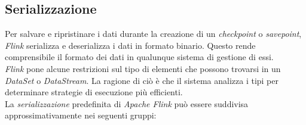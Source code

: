 \subsection{Serializzazione}
Per salvare e ripristinare i dati durante la creazione di un \textit{checkpoint} o \textit{savepoint}, \textit{Flink} serializza e deserializza i dati in formato binario. Questo rende comprensibile il formato dei dati in qualunque sistema di gestione di essi.\\
\textit{Flink} pone alcune restrizioni sul tipo di elementi che possono trovarsi in un \textit{DataSet} o \textit{DataStream}. La ragione di ciò è che il sistema analizza i tipi per determinare strategie di esecuzione più efficienti.\\
La \textit{\gls{serializzazione}} predefinita di \textit{Apache Flink} può essere suddivisa approssimativamente nei seguenti gruppi:


